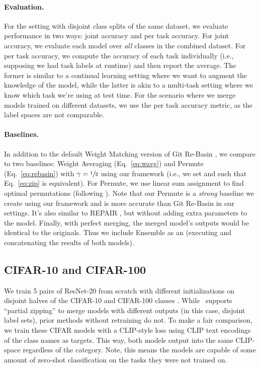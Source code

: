 \paragraph{Evaluation.}
For the setting with disjoint class splits of the same dataset, we evaluate performance in two ways: joint accuracy and per task accuracy. For joint accuracy, we evaluate each model over \textit{all} classes in the combined dataset. For per task accuracy, we compute the accuracy of each task individually (i.e., supposing we had task labels at runtime) and then report the average. The former is similar to a continual learning setting where we want to augment the knowledge of the model, while the latter is akin to a multi-task setting where we know which task we're using at test time.
For the scenario where we merge models trained on different datasets, we use the per task accuracy metric, as the label spaces are not comparable.

\paragraph{Baselines.} In addition to the default Weight Matching version of Git Re-Basin \cite{ainsworth2022git}, we compare to two baselines: Weight Averaging (Eq.~\ref{eq:wavg}) and Permute (Eq.~\ref{eq:rebasin}) with $\gamma = \sfrac{1}{2}$ using our framework (i.e., we set  and  such that Eq.~\ref{eq:zip} is equivalent). For Permute, we use linear sum assignment to find optimal permutations (following \citet{li2016convergenticlr}). Note that our Permute is a \textit{strong} baseline we create using our framework and is more accurate than Git Re-Basin in our settings. It's also similar to REPAIR \cite{jordan2022repair}, but without adding extra parameters to the model. Finally, with perfect merging, the merged model's outputs would be identical to the originals. Thus we include Ensemble as an  (executing and concatenating the results of both models).


\vspace{-0.5em}
\subsection{CIFAR-10 and CIFAR-100}
We train 5 pairs of ResNet-20 \cite{he2015deep} from scratch with different initializations on disjoint halves of the CIFAR-10 and CIFAR-100 classes \cite{krizhevsky2009cifar}. While \name{}\ supports ``partial zipping'' to merge models with different outputs (in this case, disjoint label sets), prior methods without retraining do not. To make a fair comparison, we train these CIFAR models with a CLIP-style loss \cite{radford2021learning} using CLIP text encodings of the class names as targets. 
This way, both models output into the same CLIP-space regardless of the category.
Note, this means the models are capable of some amount of zero-shot classification on the tasks they were not trained on.

